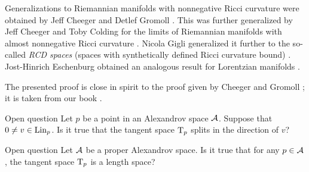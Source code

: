 Generalizations to Riemannian manifolds with nonnegative Ricci curvature were obtained by Jeff Cheeger and Detlef Gromoll \cite{cheeger-gromoll-split}.
This was further generalized by Jeff Cheeger and Toby Colding for the limits of Riemannian manifolds with almost nonnegative Ricci curvature \cite{cheeger-colding-alm-rigidity}.
Nicola Gigli generalized it further to the so-called {}\emph{RCD spaces} (spaces with synthetically defined Ricci curvature bound) \cite{gigli2013splitting, gigli-splitting-overview}.
Jost-Hinrich Eschenburg obtained an analogous result for Lorentzian manifolds \cite{eshenburg-split}.

The presented proof is close in spirit to the proof given by Cheeger and Gromoll \cite{cheeger-gromoll-split};
it is taken from our book \cite{alexander-kapovitch-petrunin2024}.

\begin{thm}{Open question}
Let $p$ be a point in an Alexandrov space $\mathcal{A}$.
Suppose that $0\ne v\in \mathop{\rm Lin}\nolimits_p$.
Is it true that the tangent space $\mathrm{T}_p$ splits in the direction of $v$?
\end{thm}

\begin{thm}{Open question}\label{open:Halb-proper}
Let $\mathcal{A}$ be a proper Alexandrov space.
Is it true that for any $p\in \mathcal{A}$, the tangent space $\mathrm{T}_p$ is a length space?
\end{thm}
